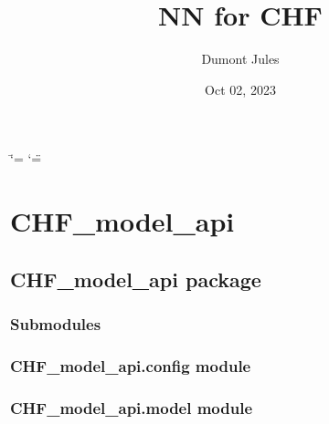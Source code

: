 \documentclass[letterpaper,10pt,english]{sphinxmanual}
\title{NN for CHF}
\date{Oct 02, 2023}
\author{Dumont Jules}
\begin{document}
\ifdefined\shorthandoff
  \ifnum\catcode`\=\string=\active\shorthandoff{=}\fi
  \ifnum\catcode`\"=\active{}\fi
\fi

\pagestyle{empty}
\sphinxmaketitle
\pagestyle{plain}
\sphinxtableofcontents
\pagestyle{normal}
\label{\detokenize{index::doc}}


\sphinxstepscope


\chapter{CHF\_model\_api}
\label{\detokenize{modules:chf-model-api}}\label{\detokenize{modules::doc}}
\sphinxstepscope


\section{CHF\_model\_api package}
\label{\detokenize{CHF_model_api:chf-model-api-package}}\label{\detokenize{CHF_model_api::doc}}

\subsection{Submodules}
\label{\detokenize{CHF_model_api:submodules}}

\subsection{CHF\_model\_api.config module}
\label{\detokenize{CHF_model_api:module-CHF_model_api.config}}\label{\detokenize{CHF_model_api:chf-model-api-config-module}}

\subsection{CHF\_model\_api.model module}
\label{\detokenize{CHF_model_api:module-CHF_model_api.model}}\label{\detokenize{CHF_model_api:chf-model-api-model-module}}
\end{document}
